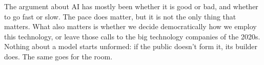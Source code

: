 The argument about AI has mostly been whether it is good or bad, and whether to go fast or slow. The pace does matter, but it is not the only thing that matters. What also matters is whether we decide democratically how we employ this technology, or leave those calls to the big technology companies of the 2020s. Nothing about a model starts unformed: if the public doesn't form it, its builder does. The same goes for the room.
